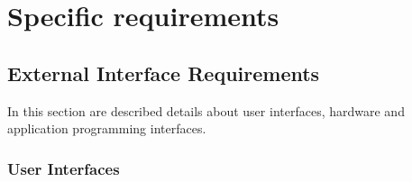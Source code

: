 \section{Specific requirements}

\subsection{External Interface Requirements}
In this section are described details about user interfaces, hardware and application programming interfaces.

\subsubsection{User Interfaces}
\begin{figure}[H]
\end{figure}
